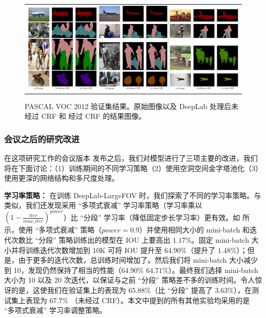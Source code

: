 \begin{figure}[!htbp]
  \centering
  \scalebox{0.55} {
  \begin{tabular}{c}
    \includegraphics[width=1.8\linewidth]{fig/voc12_aspp/results.jpg}\\
  \end{tabular}
  }
  \caption{PASCAL VOC 2012 验证集结果。原始图像以及 DeepLab 处理后未经过 CRF 和 经过 CRF 的结果图像。}
  \label{fig:ValResults}
\end{figure}


\subsubsection{会议之后的研究改进}

在这项研究工作的会议版本 \cite{chen2014semantic} 发布之后，我们对模型进行了三项主要的改进，我们将在下面讨论：（1）训练期间的不同学习策略（2）使用空洞空间金字塔池化（3）使用更深的网络结构和多尺度处理。

\textbf{学习率策略：} 在训练 DeepLab-LargeFOV 时，我们探索了不同的学习率策略。与 \cite{liu2015parsenet} 类似，我们还发现采用 ``多项式衰减'' 学习率策略（学习率乘以 $(1-\frac{iter}{max\_iter})^{power}$）比 ``分段'' 学习率（降低固定步长学习率）更有效。如  所示，使用 ``多项式衰减'' 策略（$power=0.9$）并使用相同大小的 mini-batch 和迭代次数比 ``分段'' 策略训练出的模型在 IOU 上要高出 $1.17\%$。固定 mini-batch 大小并将训练迭代次数增加到 10K 可将 IOU 提升至 $64.90\%$（提升了 $1.48\%$）；但是，由于更多的迭代次数，总训练时间增加了。然后我们将 mini-batch 大小减少到 10，发现仍然保持了相当的性能（$64.90\%$ \vs $64.71\%$）。最终我们选择 mini-batch 大小为 10 以及 20 次迭代，以保证与之前 ``分段'' 策略差不多的训练时间。令人惊讶的是，这使我们在验证集上的表现为 $65.88\%$（比 ``分段'' 提高了 $3.63\%$），在测试集上表现为 $67.7\%$ （未经过 CRF）。本文中提到的所有其他实验均采用的是 ``多项式衰减'' 学习率调整策略。

